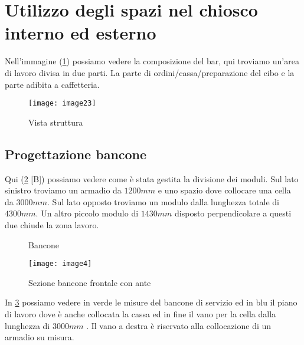 \section{Utilizzo degli spazi nel chiosco interno ed esterno}


Nell'immagine (\cref{fig:compsizionebar}) possiamo vedere la composizione del bar, qui troviamo un'area di lavoro divisa in due parti. La parte di ordini/cassa/preparazione del cibo e la parte adibita a caffetteria.

\begin{figure}[H]
	\centering
	\texttt{[image: image23]}
\end{figure}
\begin{figure}[H]
	\captionsetup[subfloat]{}
	\hspace{0.8cm}
	\hspace{1cm}
	
	\caption{Vista struttura}
	\label{fig:compsizionebar}
\end{figure}


\subsection{Progettazione bancone}
Qui  (\cref{fig:bancone} [B]) possiamo vedere come è stata gestita la divisione dei moduli. Sul lato sinistro troviamo un armadio da $1200 mm$ e uno spazio dove collocare una cella da $3000 mm$. Sul lato opposto troviamo un modulo dalla lunghezza totale di $4300 mm$.  Un  altro piccolo modulo di $1430mm$ disposto perpendicolare a questi due chiude la zona lavoro. \\

\begin{figure}[H]
	\captionsetup[subfloat]{farskip=2pt,captionskip=8pt}
	\centering
	\hspace{1cm}
	
	\caption{Bancone}
	\label{fig:bancone}
\end{figure}

\begin{figure}[H]
	\centering
	\texttt{[image: image4]}
	\caption{Sezione bancone frontale con ante}
	\label{fig:banconeante}
\end{figure}

\noindent
In \cref{fig:banconeante} possiamo vedere in verde le misure del bancone di servizio ed in blu il piano di lavoro dove è anche collocata la  cassa  ed in fine il vano per la cella dalla lunghezza di $3000 mm$ .  Il vano a destra è riservato alla collocazione di un armadio su misura. 

